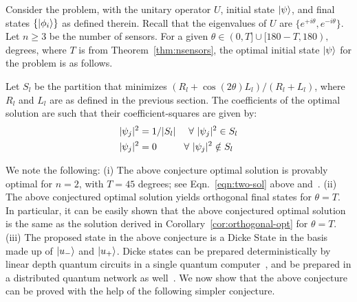 



\medskip
\begin{conjecture}
\label{conj:opt}
Consider the \iso problem, with the unitary operator $U$, initial state $\ket{\psi}$,
and final states $\{\ket{\phi_i}\}$ as defined therein. Recall that the eigenvalues of
$U$ are $\{e^{+i\theta}, e^{-i\theta}\}$. Let $n \geq 3$ be the number of sensors.
For a given $\theta \in (0, T] \cup [180-T, 180),$ degrees, where $T$ is from Theorem~\ref{thm:nsensors}, the optimal initial state $\ket{\psi}$ for the \iso 
problem is as follows. 

Let $S_l$ be the partition 
that minimizes $(R_l + \cos(2\theta)L_l)/(R_l + L_l)$,
where $R_l$ and $L_l$ are as defined in the previous section. 
The coefficients of the optimal solution are such that their coefficient-squares are given by:
\begin{align*}
|\psi_j|^{2} &= 1/|S_l|\ \ \ \ \forall\ |\psi_j|^{2} \in S_l  \\
|\psi_j|^{2} &= 0\ \hspace{0.3in}   \ \forall\ |\psi_j|^{2} \notin S_l
\end{align*}
\label{thm:optimal}
\end{conjecture}
We note the following: (i) The above conjecture optimal solution is provably optimal for $n=2$, with $T = 45$ degrees; see Eqn.~\ref{eqn:two-sol} above and~\cite{Hillery_2023}.
(ii) The above conjectured optimal solution yields orthogonal final states for $\theta = T$. 
In particular, it can be easily shown that the above conjectured optimal solution
is the same as the solution derived in Corollary~\ref{cor:orthogonal-opt} for $\theta = T$.
(iii) The proposed state in the above conjecture is a Dicke State in the basis made up of $\ket{u_{-}}$ and $\ket{u_{+}}$.
Dicke states can be prepared deterministically by linear depth quantum circuits in a single quantum computer~\cite{dicke_state}, and be prepared in a distributed quantum network as well~\cite{dickestate_distributed}.
We now show that the above conjecture can be proved with the help of the following simpler conjecture. 


